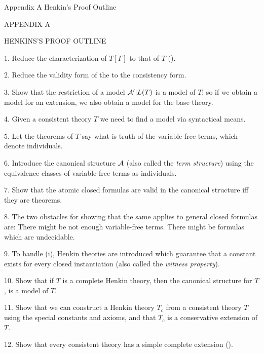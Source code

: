  {Appendix A Henkin's Proof Outline}
\centerline{\xmplbxi APPENDIX A}
\medskip
\centerline{\xmplbx HENKINS'S PROOF OUTLINE}
\bigskip

\item{1.} Reduce the characterization of $T[\Gamma]$ to that of $T$ ().
\item{2.} Reduce the validity form of the  to the consistency form.
\item{3.} Show that the restriction of a model ${\cal A}' | L(T)$ is a model of $T$; so if we
obtain a model for an extension, we also obtain a model for the base theory.
\item{4.} Given a consistent theory $T$ we need to find a model via syntactical means.
\item{5.} Let the theorems of $T$ say what is truth of the variable-free terms, which
denote individuals.
\item{6.} Introduce the canonical structure ${\cal A}$ (also called the {\it term structure})
using the equivalence classes of variable-free terms as individuals.
\item{7.} Show that the atomic closed formulas are valid in the canonical structure
iff they are theorems.
\item{8.} The two obstacles for showing that the same applies to general closed formulas
are:
 There might be not enough variable-free terms.
 There might be formulas which are undecidable.
\item{9.} To handle (i), Henkin theories are introduced which guarantee that a constant
exists for every closed instantiation (also called the {\it witness property}).
\item{10.} Show that if $T$ is a complete Henkin theory, then the canonical structure
for $T$, is a model of $T$.
\item{11.} Show that we can construct a Henkin theory $T_c$ from a consistent theory $T$
using the special constants and axioms, and that $T_c$ is a conservative extension of $T$.
\item{12.} Show that every consistent theory has a simple complete extension ().

\vfill
\break
